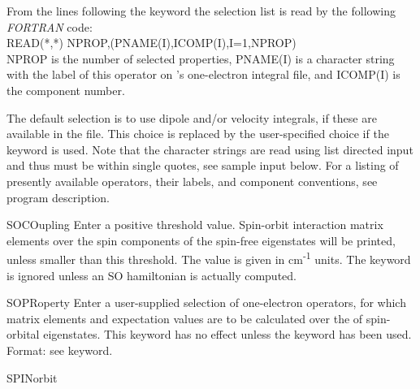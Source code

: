 \begin{keywordlist}
From the lines following the keyword the selection list is
read by the following {\sl FORTRAN} code:\\
READ({*},{*}) NPROP,(PNAME(I),ICOMP(I),I=1,NPROP)\\
NPROP is the number of selected properties, PNAME(I) is a
character string with the label of this operator on 's
one-{}electron integral file, and ICOMP(I) is the component number.

The default selection is to use dipole and/or velocity integrals, if
these are available in the  file. This choice is replaced by the
user-specified choice if the  keyword is used.
Note that the character strings are read using list directed input and
thus must be within single quotes, see sample input below.
For a listing of presently available operators, their labels, and
component conventions, see
 program description.
\item[SOCOupling]
Enter a positive threshold value. Spin-orbit interaction matrix
elements over the spin components of the spin-free eigenstates
will be printed, unless smaller than this threshold.
The value is given in cm\textsuperscript{-1} units. The keyword is
ignored unless an SO hamiltonian is actually computed.
\item[SOPRoperty]
Enter a user-supplied selection of one-electron operators, for which
matrix elements and expectation values are to be calculated over the
of spin-orbital eigenstates. This keyword has no effect unless the
 keyword has been used. Format: see  keyword.
\item[SPINorbit]

\end{keywordlist}

